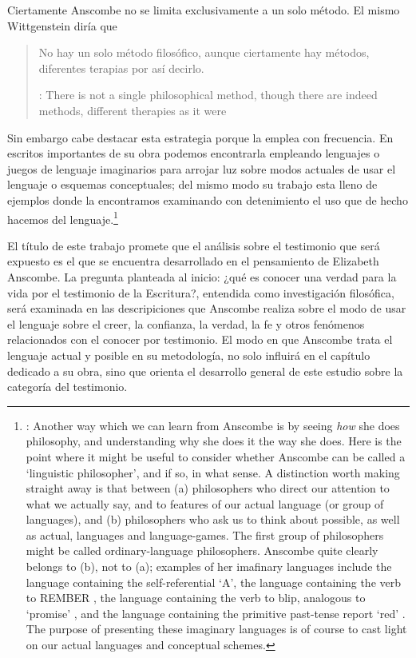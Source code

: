 Ciertamente Anscombe no se limita exclusivamente a un solo método. El mismo
Wittgenstein diría que
\blockquote[{\cite[\S133]{wittgenstein1953phiinv}}: There is not a single
philosophical method, though there are indeed methods, different therapies as it
were]{No hay un solo método filosófico, aunque ciertamente hay métodos,
  diferentes terapias por así decirlo.}

Sin embargo cabe destacar esta estrategia porque la emplea con frecuencia. En
escritos importantes de su obra podemos encontrarla empleando lenguajes o juegos
de lenguaje imaginarios para arrojar luz sobre modos actuales de usar el
lenguaje o esquemas conceptuales; del mismo modo su trabajo esta lleno de
ejemplos donde la encontramos examinando con detenimiento el uso que de hecho
hacemos del lenguaje.\footnote{\cite[Cf.~][228--229]{teichmann2008ans}: Another
  way which we can learn from Anscombe is by seeing \emph{how} she does
  philosophy, and understanding why she does it the way she does. Here is the
  point where it might be useful to consider whether Anscombe can be called a
  `linguistic philosopher', and if so, in what sense. A distinction worth making
  straight away is that between (a) philosophers who direct our attention to
  what we actually say, and to features of our actual language (or group of
  languages), and (b) philosophers who ask us to think about possible, as well
  as actual, languages and language-games. The first group of philosophers might
  be called ordinary-language philosophers. Anscombe quite clearly belongs to
  (b), not to (a); examples of her imafinary languages include the language
  containing the self-referential `A', the language containing the verb to
  REMBER \textelp{}, the language containing the verb to blip, analogous to
  `promise' \textelp{}, and the language containing the primitive past-tense
  report `red' \textelp{}. The purpose of presenting these imaginary languages
  is of course to cast light on our actual languages and conceptual schemes.}

El título de este trabajo promete que el análisis sobre el testimonio que será
expuesto es el que se encuentra desarrollado en el pensamiento de Elizabeth
Anscombe. La pregunta planteada al inicio: ¿qué es conocer una verdad para la
vida por el testimonio de la Escritura?, entendida como investigación
filosófica, será examinada en las descripiciones que Anscombe realiza sobre el
modo de usar el lenguaje sobre el creer, la confianza, la verdad, la fe y otros
fenómenos relacionados con el conocer por testimonio. El modo en que Anscombe
trata el lenguaje actual y posible en su metodología, no solo influirá en el
capítulo dedicado a su obra, sino que orienta el desarrollo general de este
estudio sobre la categoría del testimonio.

